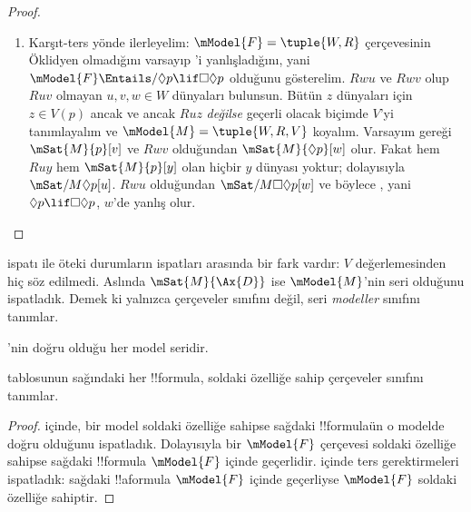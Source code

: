 \documentclass[../../../include/open-logic-section]{subfiles}
\begin{document}
\begin{proof}
\begin{enumerate}
    tanımlayalım (diğer yerlerde $V$ gelişigüzel olsun) ve
    $\mModel{M}=\tuple{W,R,V}$ koyalım. $V$'nin tanımı gereği $Ruz$ olan
    her $z$ için $\mSat{M}{p}[z]$, dolayısıyla $\mSat{M}{\Box p}[u]$ olur.
    Varsayıma göre , yani $\Box p\lif\Box\Box p$, $u$'da doğrudur;
    öyleyse $\mSat{M}{\Box\Box p}[u]$. $Ruv$ ve $Rvw$ olduğundan
    $\mSat{M}{p}[w]$; $V$'nin tanımına göre bu ancak $Ruw$ ise mümkündür.
  \item Karşıt-ters yönde ilerleyelim: $\mModel{F}=\tuple{W,R}$
    çerçevesinin Öklidyen olmadığını varsayıp 'i yanlışladığını, yani
    $\mModel{F}\Entails/\Diamond p\lif\Box\Diamond p$ olduğunu gösterelim.
    $Rwu$ ve $Rwv$ olup $Ruv$ olmayan $u,v,w\in W$ dünyaları bulunsun.
    Bütün $z$ dünyaları için $z\in V(p)$ ancak ve ancak $Ruz$ \emph{değilse}
    geçerli olacak biçimde $V$'yi tanımlayalım ve
    $\mModel{M}=\tuple{W,R,V}$ koyalım. Varsayım gereği
    $\mSat{M}{p}[v]$ ve $Rwv$ olduğundan $\mSat{M}{\Diamond p}[w]$ olur.
    Fakat hem $Ruy$ hem $\mSat{M}{p}[y]$ olan hiçbir $y$ dünyası yoktur;
    dolayısıyla $\mSat/{M}{\Diamond p}[u]$. $Rwu$ olduğundan
    $\mSat/{M}{\Box\Diamond p}[w]$ ve böylece , yani
    $\Diamond p\lif\Box\Diamond p$, $w$'de yanlış olur.
  \end{enumerate}
\end{proof}

 ispatı ile öteki durumların ispatları arasında bir fark vardır:
$V$ değerlemesinden hiç söz edilmedi. Aslında $\mSat{M}{\Ax{D}}$ ise
$\mModel{M}$'nin seri olduğunu ispatladık. Demek ki  yalnızca
çerçeveler sınıfını değil, seri \emph{modeller} sınıfını tanımlar.

\begin{cor}
  'nin doğru olduğu her model seridir.
\end{cor}

\begin{cor}
 tablosunun sağındaki her !!{formula}, soldaki
özelliğe sahip çerçeveler sınıfını tanımlar.
\end{cor}

\begin{proof}
   içinde, bir model soldaki özelliğe sahipse
  sağdaki !!{formula}{}ün o modelde doğru olduğunu ispatladık. Dolayısıyla
  bir $\mModel{F}$ çerçevesi soldaki özelliğe sahipse sağdaki !!{formula}
  $\mModel{F}$ içinde geçerlidir.  içinde
  ters gerektirmeleri ispatladık: sağdaki !!a{formula} $\mModel{F}$ içinde
  geçerliyse $\mModel{F}$ soldaki özelliğe sahiptir.
\end{proof}
\end{document}
